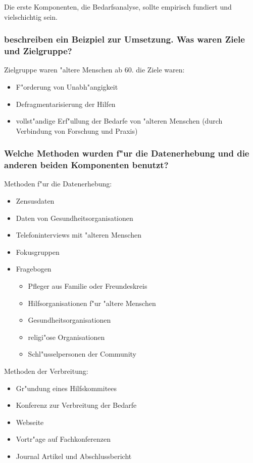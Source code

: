 Die erste Komponenten, die Bedarfsanalyse, sollte empirisch fundiert und vielschichtig sein.

\subsubsection{\Textcite{finifter_comprehensive_2005} beschreiben ein Beizpiel zur Umsetzung. Was waren Ziele und Zielgruppe?}
Zielgruppe waren "altere Menschen ab 60. die Ziele waren:
\begin{itemize}
        \item F"orderung von Unabh"angigkeit
        \item Defragmentarisierung der Hilfen
        \item vollst"andige Erf"ullung der Bedarfe von "alteren Menschen (durch Verbindung von Forschung und Praxis)
\end{itemize}

\subsubsection{Welche Methoden wurden f"ur die Datenerhebung und die anderen beiden Komponenten benutzt?}
Methoden f"ur die Datenerhebung:
\label{sec:verbreit}
\begin{itemize}
        \item Zensusdaten
        \item Daten von Gesundheitsorganisationen
        \item Telefoninterviews mit "alteren Menschen
        \item Fokusgruppen
        \item Fragebogen
                \begin{itemize}
                        \item Pfleger aus Familie oder Freundeskreis
                        \item Hilfsorganisationen f"ur "altere Menschen
                        \item Gesundheitsorganisationen
                        \item religi"ose Organisationen
                        \item Schl"usselpersonen der Community
                \end{itemize}
\end{itemize}

Methoden der Verbreitung:
\begin{itemize}
        \item Gr"undung eines Hilfskommitees
        \item Konferenz zur Verbreitung der Bedarfe
        \item Webseite
        \item Vortr"age auf Fachkonferenzen
        \item Journal Artikel und Abschlussbericht
\end{itemize}

